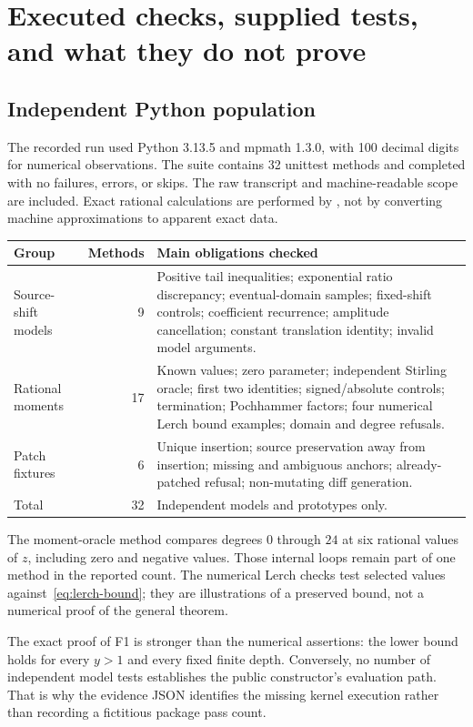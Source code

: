 \documentclass[11pt,letterpaper]{article}
\newcommand{\code}[1]{\texttt{\detokenize{#1}}}
\begin{document}
\section{Executed checks, supplied tests, and what they do not prove}
\label{sec:tests}
\subsection{Independent Python population}
The recorded run used Python 3.13.5 and mpmath 1.3.0, with 100 decimal digits for numerical observations. The suite contains 32 unittest methods and completed with no failures, errors, or skips. The raw transcript and machine-readable scope are included. Exact rational calculations are performed by \code{Fraction}, not by converting machine approximations to apparent exact data.

\begin{tabularx}{\textwidth}{@{}p{1.55in}rX@{}}
\toprule
Group & Methods & Main obligations checked\\
\midrule
Source-shift models & 9 & Positive tail inequalities; exponential ratio discrepancy; eventual-domain samples; fixed-shift controls; coefficient recurrence; amplitude cancellation; constant translation identity; invalid model arguments.\\[3pt]
Rational moments & 17 & Known values; zero parameter; independent Stirling oracle; first two identities; signed/absolute controls; termination; Pochhammer factors; four numerical Lerch bound examples; domain and degree refusals.\\[3pt]
Patch fixtures & 6 & Unique insertion; source preservation away from insertion; missing and ambiguous anchors; already-patched refusal; non-mutating diff generation.\\
\midrule
Total & 32 & Independent models and prototypes only.\\
\bottomrule
\end{tabularx}

The moment-oracle method compares degrees $0$ through $24$ at six rational values of $z$, including zero and negative values. Those internal loops remain part of one method in the reported count. The numerical Lerch checks test selected values against~\eqref{eq:lerch-bound}; they are illustrations of a preserved bound, not a numerical proof of the general theorem.

The exact proof of F1 is stronger than the numerical assertions: the lower bound holds for every $y>1$ and every fixed finite depth. Conversely, no number of independent model tests establishes the public constructor's evaluation path. That is why the evidence JSON identifies the missing kernel execution rather than recording a fictitious package pass count.
\end{document}
